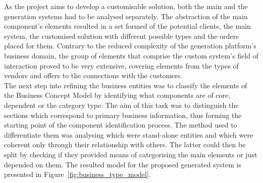 As the project aims to develop a customisable solution, both the main and the generation systems had to be analysed separately. The abstraction of the main component's elements resulted in a set formed of the potential clients, the main system, the customised solution with different possible types and the orders placed for them. Contrary to the reduced complexity of the generation platform's business domain, the group of elements that comprise the custom system's field of interaction proved to be very extensive, covering elements from the types of vendors and offers to the connections with the customers.\\ 

The next step into refining the business entities was to classify the elements of the Business Concept Model by identifying what components are of core, dependent or the category type. The aim of this task was to distinguish the sections which correspond to primary business information, thus forming the starting point of the component identification process. The method used to differentiate them was analysing which were stand-alone entities and which were coherent only through their relationship with others. The latter could then be split by checking if they provided means of categorising the main elements or just depended on them. The resulted model for the proposed generated system is presented in Figure~\ref{fig:business_type_model}.\\

